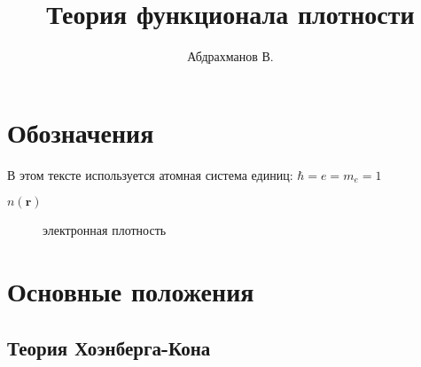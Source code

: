\documentclass[article]{ncc}
\title{Теория функционала плотности}
\author{Абдрахманов В.}
\renewcommand{\vec}{\boldsymbol}
\begin{document}
    \maketitle
    \tableofcontents
    \section*{Обозначения}
    В этом тексте используется атомная система единиц: $ \hbar = e = m_e = 1$
    \begin{description}
        \item[$n(\vec{r})$] электронная плотность
    \end{description}
    \section{Основные положения}
    \subsection{Теория Хоэнберга-Кона}
\end{document}
